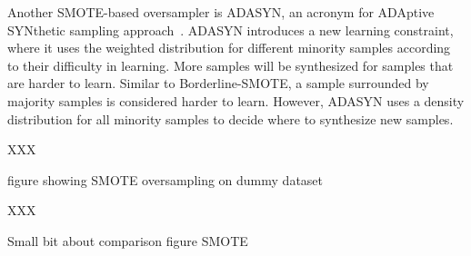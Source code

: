 Another SMOTE-based oversampler is ADASYN, an acronym for ADAptive SYNthetic sampling approach~\cite{He2008ADASYN:Learning}. ADASYN introduces a new learning constraint, where it uses the weighted distribution for different minority samples according to their difficulty in learning. More samples will be synthesized for samples that are harder to learn. Similar to Borderline-SMOTE, a sample surrounded by majority samples is considered harder to learn. However, ADASYN uses a density distribution for all minority samples to decide where to synthesize new samples.


XXX

figure showing SMOTE oversampling on dummy dataset

XXX

Small bit about comparison figure SMOTE